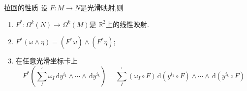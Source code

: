 \documentclass[../../几何与拓扑.tex]{subfiles}
\begin{document}
\begin{lemma}{拉回的性质}
    设 $ F:M\to N $是光滑映射,则
    \begin{enumerate}
        \item $ F^{*}:\Omega ^{k}\left( N \right)\to \Omega ^{k}\left( M \right)   $是 $ \mathbb{R} ^{2} $上的线性映射.
        \item $ F^{*}\left( \omega \wedge \eta  \right) = \left( F^{*}\omega  \right)\wedge \left( F^{*}\eta  \right)    $;
        \item 在任意光滑坐标卡上 $$
        F^{*}\left( \sum _{I}^{\prime} \omega _{I} \,\mathrm{d} y^{i_1}\wedge \cdots \wedge \,\mathrm{d} y^{i_{k}}  \right) = \sum _{I}^{\prime} \left( \omega _{I}\circ F \right) \,\mathrm{d} \left( y^{i_1}\circ F \right)  \wedge \cdots \wedge \,\mathrm{d} \left( y^{i_{k}} \circ F\right)  
        $$   
    \end{enumerate}
     
\end{lemma}
\end{document}
